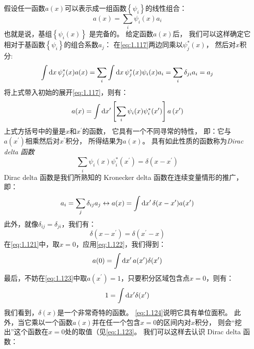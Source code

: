 假设任一函数$a(x)$可以表示成一组函数$\left\{\psi_i\right\}$的线性组合：
\begin{equation}
 a(x) = \sum_i \psi_i(x)a_i
 \label{eq:1.117}
\end{equation}
也就是说，基组$\left\{\psi_i(x)\right\}$ 是完备的。
给定函数$a(x)$后，
我们可以这样确定它相对于基函数$\left\{\psi_i\right\}$的组合系数$a_j$：
在\autoref{eq:1.117}两边同乘以$\psi_j^\ast(x)$，
然后对$x$积分:
\begin{equation}
 \int \mathrm{d}x\,\psi_j^\ast(x)a(x) = \sum_i \int \mathrm{d}x\,\psi_j^\ast(x)\psi_i(x)a_i = \sum_i \delta_{ji}a_i = a_j
 \label{eq:1.118}
\end{equation}
将上式带入初始的展开\autoref{eq:1.117}，则有：
\begin{equation}
 a(x) = \int \mathrm{d}x^\prime\left[\sum_i\psi_i(x)\psi_i^\ast(x^\prime)\right]a\left(x^\prime\right)
 \label{eq:1.119}
\end{equation}
上式方括号中的量是$x$和$x^\prime$的函数，
它具有一个不同寻常的特性，
即：它与$a(x^\prime)$相乘然后对$x^\prime$积分，
所得结果为$a(x)$。
具有如此性质的函数称为\emph{Dirac delta 函数}
\begin{equation}
 \sum_i \psi_i(x)\psi_i^\ast(x^\prime) = \delta(x-x^\prime)
 \label{eq:1.120}
\end{equation}
Dirac delta 函数是我们所熟知的 Kronecker delta 函数在连续变量情形的推广，即：
\begin{equation}
 a_i = \sum_j\delta_{ij}a_j \leftrightarrow a(x) = \int\mathrm{d}x^\prime\,\delta(x-x^\prime)a(x^\prime)
 \label{eq:1.121}
\end{equation}
此外，就像$\delta_{ij} = \delta_{ji}$，我们有：
\begin{equation}
 \delta(x-x^\prime) = \delta(x^\prime -x)
 \label{eq:1.122}
\end{equation}
在\autoref{eq:1.121}中，取$x=0$，应用\autoref{eq:1.122}，我们得到：
\begin{equation}
 a(0) = \int \mathrm{d}x^\prime\,a(x^\prime)\delta(x^\prime)
 \label{eq:1.123}
\end{equation}
最后，不妨在\autoref{eq:1.123}中取$a(x^\prime)=1$，只要积分区域包含点$x=0$，则有：
\begin{equation}
 1 = \int \mathrm{d}x^\prime \delta(x^\prime)
 \label{eq:1.124}
\end{equation}
我们看到，$\delta(x)$是一个非常奇特的函数。
\autoref{eq:1.124}说明它具有单位面积。
此外，当它乘以一个函数$a(x)$并在任一个包含$x=0$的区间内对$x$积分，
则会``挖出''这个函数在$x=0$处的取值（见\autoref{eq:1.123}。
我们可以这样去认识 Dirac delta 函数：
